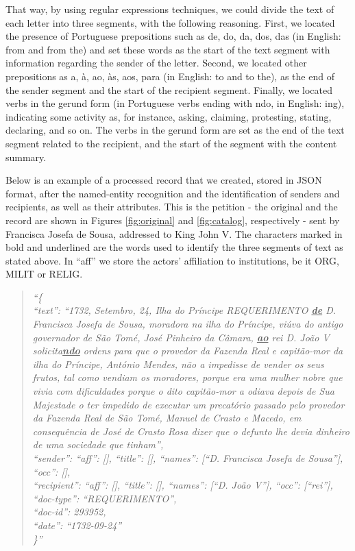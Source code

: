 \documentclass{article}
\begin{document}
That way, by using regular expressions techniques, we could divide the text of each letter into three segments, with the following reasoning. First, we located the presence of Portuguese prepositions such as de, do, da, dos, das (in English: from and from the) and set these words as the start of the text segment with information regarding the sender of the letter. Second, we located other prepositions as a, à, ao, às, aos, para (in English: to and to the), as the end of the sender segment and the start of the recipient segment. Finally, we located verbs in the gerund form (in Portuguese verbs ending with ndo, in English: ing), indicating some activity as, for instance, asking, claiming, protesting, stating, declaring, and so on. The verbs in the gerund form are set as the end of the text segment related to the recipient, and the start of the segment with the content summary.

Below is an example of a processed record that we created, stored in JSON format, after the named-entity recognition and the identification of senders and recipients, as well as their attributes. This is the petition - the original and the record are shown in Figures \ref{fig:original} and \ref{fig:catalog}, respectively - sent by Francisca Josefa de Sousa, addressed to King John V. The characters marked in bold and underlined are the words used to identify the three segments of text as stated above. In “aff” we store the actors’ affiliation to institutions, be it ORG, MILIT or RELIG.

\begin{quotation}
\noindent
\textit{
``\{ \\
	``text'': ``1732, Setembro, 24, Ilha do Príncipe REQUERIMENTO \textbf{\underline{de}} D. Francisca Josefa de Sousa, moradora na ilha do Príncipe, viúva do antigo governador de São Tomé, José Pinheiro da Câmara, \textbf{\underline{ao}} rei D. João V solicita\textbf{\underline{ndo}} ordens para que o provedor da Fazenda Real e capitão-mor da ilha do Príncipe, António Mendes, não a impedisse de vender os seus frutos, tal como vendiam os moradores, porque era uma mulher nobre que vivia com dificuldades porque o dito capitão-mor a odiava depois de Sua Majestade o ter impedido de executar um precatório passado pelo provedor da Fazenda Real de São Tomé, Manuel de Crasto e Macedo, em consequência de José de Crasto Rosa dizer que o defunto lhe devia dinheiro de uma sociedade que tinham'', \\
	``sender'': {``aff'': [], ``title'': [], ``names'': [``D. Francisca Josefa de Sousa''], \\
	``occ'': []}, \\
	``recipient'': {``aff'': [], ``title'': [], ``names'': [``D. João V''], ``occ'': [``rei'']}, \\
	``doc-type'': ``REQUERIMENTO'', \\
	``doc-id'': 293952, \\
	``date'': ``1732-09-24'' \\
\}''}
\end{quotation}
\end{document}
